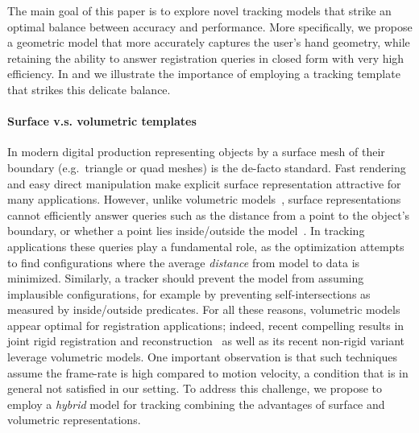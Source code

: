 The main goal of this paper is to explore novel tracking models that strike an optimal balance between accuracy and performance. More specifically, we propose a geometric model that more accurately captures the user's hand geometry, while retaining the ability to answer registration queries in closed form with very high efficiency. In  and  we illustrate the importance of employing a tracking template that strikes this delicate balance.



\paragraph{Surface v.s. volumetric templates}
In modern digital production representing objects by a surface mesh of their boundary (e.g.\ triangle or quad meshes) is the de-facto standard. Fast rendering and easy direct manipulation make explicit surface representation attractive for many applications.
%
However, unlike volumetric models~\cite{bloomenthal1997book}, surface representations cannot efficiently answer queries such as the distance from a point to the object's boundary, or whether a point lies inside/outside the model~\cite[Ch.1]{botsch2010book}. In tracking applications these queries play a fundamental role, as the optimization attempts to find configurations where the average \emph{distance} from model to data is minimized. Similarly, a tracker should prevent the model from assuming implausible configurations, for example by preventing self-intersections as measured by inside/outside predicates. For all these reasons, volumetric models appear optimal for registration applications; indeed, recent compelling results in joint rigid registration and reconstruction~\cite{newcombe2011kinfu} as well as its recent non-rigid variant~\cite{newcombe2015dynfusion} leverage volumetric models. One important observation is that such techniques assume the frame-rate is high compared to motion velocity, a condition that is in general not satisfied in our setting.  To address this challenge, we propose to employ a \emph{hybrid} model for tracking combining the advantages of surface and volumetric representations.


